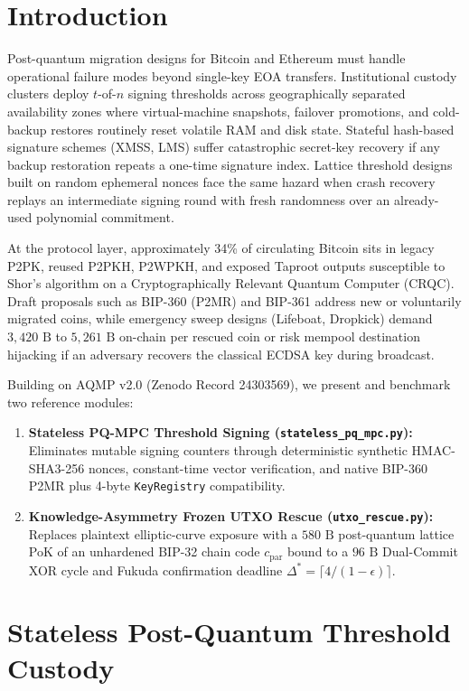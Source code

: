 \documentclass[conference,compsoc]{IEEEtran}
\begin{document}
\section{Introduction}
\label{sec:intro}

Post-quantum migration designs for Bitcoin and Ethereum must handle operational failure modes beyond single-key EOA transfers. Institutional custody clusters deploy $t$-of-$n$ signing thresholds across geographically separated availability zones where virtual-machine snapshots, failover promotions, and cold-backup restores routinely reset volatile RAM and disk state. Stateful hash-based signature schemes (XMSS, LMS) suffer catastrophic secret-key recovery if any backup restoration repeats a one-time signature index. Lattice threshold designs built on random ephemeral nonces face the same hazard when crash recovery replays an intermediate signing round with fresh randomness over an already-used polynomial commitment.

At the protocol layer, approximately 34\% of circulating Bitcoin sits in legacy P2PK, reused P2PKH, P2WPKH, and exposed Taproot outputs susceptible to Shor's algorithm on a Cryptographically Relevant Quantum Computer (CRQC). Draft proposals such as BIP-360 (P2MR) and BIP-361 address new or voluntarily migrated coins, while emergency sweep designs (Lifeboat, Dropkick) demand $3{,}420\text{ B}$ to $5{,}261\text{ B}$ on-chain per rescued coin or risk mempool destination hijacking if an adversary recovers the classical ECDSA key during broadcast.

Building on AQMP v2.0 (Zenodo Record 24303569), we present and benchmark two reference modules:
\begin{enumerate}
    \item \textbf{Stateless PQ-MPC Threshold Signing (\texttt{stateless\_pq\_\allowbreak mpc.py}):} Eliminates mutable signing counters through deterministic synthetic HMAC-SHA3-256 nonces, constant-time vector verification, and native BIP-360 P2MR plus 4-byte \texttt{KeyRegistry} compatibility.
    \item \textbf{Knowledge-Asymmetry Frozen UTXO Rescue (\texttt{utxo\_rescue.py}):} Replaces plaintext elliptic-curve exposure with a $580\text{ B}$ post-quantum lattice PoK of an unhardened BIP-32 chain code $c_{\text{par}}$ bound to a $96\text{ B}$ Dual-Commit XOR cycle and Fukuda confirmation deadline $\Delta^* = \lceil 4/(1-\epsilon)\rceil$.
\end{enumerate}

\section{Stateless Post-Quantum Threshold Custody}
\label{sec:mpc}
\end{document}
